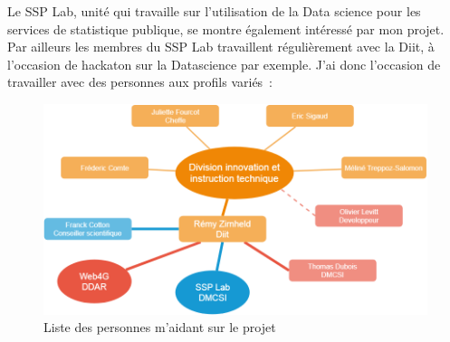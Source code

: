 Le SSP Lab, unité qui travaille sur l'utilisation de la Data science pour les services de statistique publique, se montre également intéressé par mon projet. Par ailleurs les membres du SSP Lab travaillent régulièrement avec la Diit, à l'occasion de hackaton sur la Datascience par exemple. J'ai donc l'occasion de travailler avec des personnes aux profils variés~:
\vspace{10pt}
\begin{figure}[H]
  \centering
  \includegraphics[scale=0.45]{images/Organigramme-stage.png}
  \caption{Liste des personnes m'aidant sur le projet}
  \label{fig:Organigramme}
\end{figure}

\vspace{20pt}

